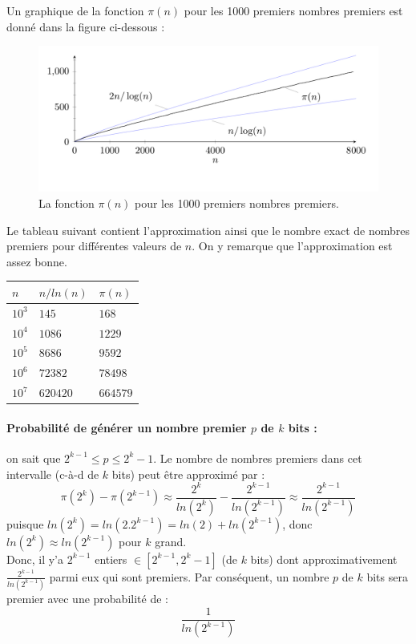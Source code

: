 		Un graphique de la fonction $\pi(n)$ pour les 1000 premiers nombres premiers est donné dans la figure ci-dessous :
		\begin{figure}[H]
			\begin{center}\includegraphics[scale=0.4]{freqPremiers.png}\end{center}\vspace{-3em}
			\caption{La fonction $\pi(n)$ pour les 1000 premiers nombres premiers.}\label{fig:M3}
		\end{figure}
		
		Le tableau suivant contient l'approximation ainsi que le nombre exact de nombres premiers pour différentes valeurs de $n$. On y remarque que l'approximation est assez bonne.
		\begin{table}[H]\begin{center}
			\begin{tabular}{|lll|}
			\hline
			$n$  & $n/ln(n)$ & $\pi(n)$     \\ \hline
			$10^{3}$ & $145$     & $168$     \\
			$10^{4}$ & $1 086$   & $1 229$   \\
			$10^{5}$ & $8 686$   & $9 592$   \\
			$10^{6}$ & $72 382$  & $78 498$  \\
			$10^{7}$ & $620 420$ & $664 579$ \\ \hline
			\end{tabular}
		\end{center}\end{table}
		
		\paragraph{Probabilité de générer un nombre premier $p$ de $k$ bits :} on sait que $2^{k-1} \leqslant p \leqslant 2^{k}-1$. Le nombre de nombres premiers dans cet intervalle (c-à-d de $k$ bits) peut être approximé par :
		\[ \pi(2^{k}) - \pi(2^{k-1}) \approx \frac{2^{k}}{ln(2^{k})} - \frac{2^{k-1}}{ln(2^{k-1})} \approx \frac{2^{k-1}}{ln(2^{k-1})}	\]
		puisque $ln(2^{k}) = ln(2.2^{k-1}) = ln(2) + ln(2^{k-1})$, donc $ln(2^{k}) \approx ln(2^{k-1})$ pour $k$ grand.
		\vspace{1em}
		\\
		\noindent Donc, il y'a $2^{k-1}$ entiers $\in [2^{k-1},2^{k}-1]$ (de $k$ bits) dont approximativement $\frac{2^{k-1}}{ln(2^{k-1})}$ parmi eux qui sont premiers. Par conséquent, un nombre $p$ de $k$ bits sera premier avec une probabilité de :
		\[\frac{1}{ln(2^{k-1})}\]
		
